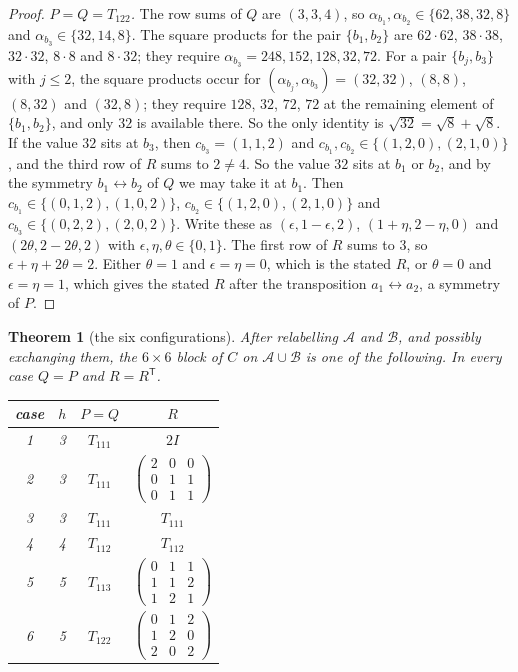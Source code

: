 \documentclass[11pt,a4paper]{amsart}
\newtheorem{theorem}{Theorem}[section]
\theoremstyle{definition}
\theoremstyle{remark}
\newcommand{\cA}{\mathcal{A}}
\newcommand{\cB}{\mathcal{B}}
\newcommand{\T}{\mathsf{T}}
\begin{document}
\begin{proof}
\emph{$P=Q=T_{122}$.} The row sums of $Q$ are $(3,3,4)$, so $\alpha_{b_1},\alpha_{b_2}\in\{62,38,32,8\}$ and
$\alpha_{b_3}\in\{32,14,8\}$. The square products for the pair $\{b_1,b_2\}$ are $62\cdot62$, $38\cdot38$,
$32\cdot32$, $8\cdot8$ and $8\cdot32$; they require $\alpha_{b_3}=248,152,128,32,72$. For a pair
$\{b_j,b_3\}$ with $j\le2$, the square products occur for $(\alpha_{b_j},\alpha_{b_3})=(32,32)$, $(8,8)$,
$(8,32)$ and $(32,8)$; they require $128$, $32$, $72$, $72$ at the remaining element of $\{b_1,b_2\}$, and only $32$
is available there. So the only
identity is $\sqrt{32}=\sqrt8+\sqrt8$. If the value $32$ sits at $b_3$, then $c_{b_3}=(1,1,2)$ and
$c_{b_1},c_{b_2}\in\{(1,2,0),(2,1,0)\}$, and the third row of $R$ sums to $2\ne4$. So the value $32$ sits at $b_1$
or $b_2$, and by the symmetry $b_1\leftrightarrow b_2$ of $Q$ we may take it at $b_1$. Then
$c_{b_1}\in\{(0,1,2),(1,0,2)\}$, $c_{b_2}\in\{(1,2,0),(2,1,0)\}$ and $c_{b_3}\in\{(0,2,2),(2,0,2)\}$. Write these as
$(\epsilon,1-\epsilon,2)$, $(1+\eta,2-\eta,0)$ and $(2\theta,2-2\theta,2)$ with $\epsilon,\eta,\theta\in\{0,1\}$. The
first row of $R$ sums to $3$, so $\epsilon+\eta+2\theta=2$. Either $\theta=1$ and $\epsilon=\eta=0$, which is
the stated $R$, or $\theta=0$ and $\epsilon=\eta=1$, which gives the stated $R$ after the transposition
$a_1\leftrightarrow a_2$, a symmetry of $P$.
\end{proof}

\begin{theorem}[the six configurations]\label{thm:six}
After relabelling $\cA$ and $\cB$, and possibly exchanging them, the $6\times6$ block of $C$ on $\cA\cup\cB$ is
one of the following. In every case $Q=P$ and $R=R^{\T}$.
\begin{center}
\renewcommand{\arraystretch}{2.1}
\begin{tabular}{@{}cccc@{}}
\toprule
case & $h$ & $P=Q$ & $R$\\
\midrule
1 & 3 & $T_{111}$ & $2I$\\
2 & 3 & $T_{111}$ & $\left(\begin{smallmatrix}2&0&0\\0&1&1\\0&1&1\end{smallmatrix}\right)$\\
3 & 3 & $T_{111}$ & $T_{111}$\\
4 & 4 & $T_{112}$ & $T_{112}$\\
5 & 5 & $T_{113}$ & $\left(\begin{smallmatrix}0&1&1\\1&1&2\\1&2&1\end{smallmatrix}\right)$\\
6 & 5 & $T_{122}$ & $\left(\begin{smallmatrix}0&1&2\\1&2&0\\2&0&2\end{smallmatrix}\right)$\\
\bottomrule
\end{tabular}
\end{center}
\end{theorem}
\end{document}
